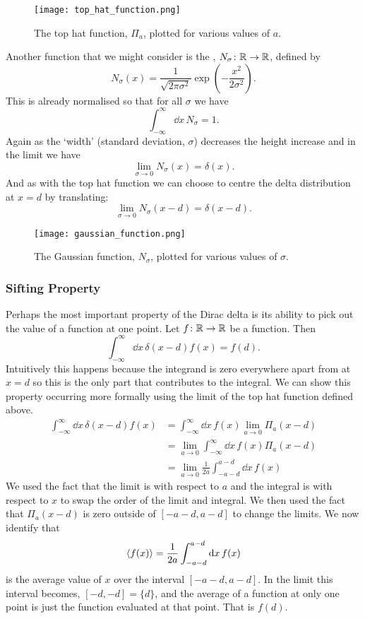 \documentclass[a4paper]{article}
\begin{document}
    \begin{figure}[ht]
        \centering
        \texttt{[image: top\_hat\_function.png]}
        \caption{The top hat function, \(\Pi_a\), plotted for various values of \(a\).}
    \end{figure}
    
    Another function that we might consider is the , \(N_\sigma\colon\mathbb{R}\to\mathbb{R}\), defined by
    \[N_\sigma(x) = \frac{1}{\sqrt{2\pi\sigma^2}}\exp\left(-\frac{x^2}{2\sigma^2}\right).\]
    This is already normalised so that for all \(\sigma\) we have
    \[\int_{-\infty}^{\infty} \dd x\,N_\sigma = 1.\]
    Again as the `width' (standard deviation, \(\sigma\)) decreases the height increase and in the limit we have
    \[\lim_{\sigma \to 0} N_\sigma(x) = \delta(x).\]
    And as with the top hat function we can choose to centre the delta distribution at \(x = d\) by translating:
    \[\lim_{\sigma \to 0} N_\sigma(x - d) = \delta(x - d).\]
    
    \begin{figure}[ht]
        \centering
        \texttt{[image: gaussian\_function.png]}
        \caption{The Gaussian function, \(N_\sigma\), plotted for various values of \(\sigma\).}
    \end{figure}
    
    \subsubsection{Sifting Property}\label{sec:sifting property dirac delta}
    Perhaps the most important property of the Dirac delta is its ability to pick out the value of a function at one point.
    Let \(f\colon\mathbb{R}\to\mathbb{R}\) be a function.
    Then
    \[\int_{-\infty}^{\infty} \dd x\,\delta(x - d)f(x) = f(d).\]
    Intuitively this happens because the integrand is zero everywhere apart from at \(x = d\) so this is the only part that contributes to the integral.
    We can show this property occurring more formally using the limit of the top hat function defined above.
    \begin{align*}
        \int_{-\infty}^{\infty} \dd x\,\delta(x - d)f(x) &= \int_{-\infty}^{\infty} \dd x\, f(x)\lim_{a \to 0}\Pi_a(x - d)\\
        &= \lim_{a \to 0}\int_{-\infty}^{\infty} \dd x\, f(x)\Pi_a(x - d)\\
        &= \lim_{a \to 0}\frac{1}{2a}\int_{-a - d}^{a - d} \dd x\, f(x)
    \end{align*}
    We used the fact that the limit is with respect to \(a\) and the integral is with respect to \(x\) to swap the order of the limit and integral.
    We then used the fact that \(\Pi_a(x - d)\) is zero outside of \([-a-d, a-d]\) to change the limits.
    We now identify that
    \[\langle{f(x)}\rangle = \frac{1}{2a}\int_{-a-d}^{a-d} \dd x\, f(x)\]
    is the average value of \(x\) over the interval \([-a-d, a-d]\).
    In the limit this interval becomes, \([-d, -d] = \{d\}\), and the average of a function at only one point is just the function evaluated at that point.
    That is \(f(d)\).
    
\end{document}
